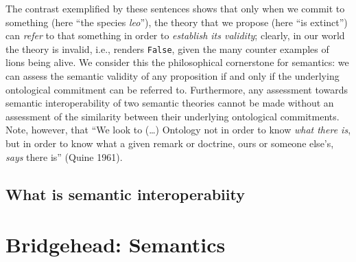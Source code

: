 \documentclass[a4paper,11pt,oneside,oldfontcommands]{memoir}
\theoremstyle{definition}
\theoremstyle{break}		%
\numberwithin{equation}{chapter}
\numberwithin{figure}{chapter}
\begin{document}
The contrast exemplified by these sentences shows that only when we
commit to something (here ``the species \emph{leo}''), the theory that
we propose (here ``is extinct'') can \emph{refer} to that something in
order to \emph{establish its validity}; clearly, in our world the theory
is invalid, i.e., renders \texttt{False}, given the many counter
examples of lions being alive. We consider this the philosophical
cornerstone for semantics: we can assess the semantic validity of any
proposition if and only if the underlying ontological commitment can be
referred to. Furthermore, any assessment towards semantic
interoperability of two semantic theories cannot be made without an
assessment of the similarity between their underlying ontological
commitments. Note, however, that ``We look to (\ldots{}) Ontology not in
order to know \emph{what there is}, but in order to know what a given
remark or doctrine, ours or someone else's, \emph{says} there is''
(Quine 1961).

\hypertarget{what-is-semantic-interoperabiity}{%
\section{What is semantic
interoperabiity}\label{what-is-semantic-interoperabiity}}

\hypertarget{bridgehead-semantics}{%
\chapter{Bridgehead: Semantics}\label{bridgehead-semantics}}
\end{document}
